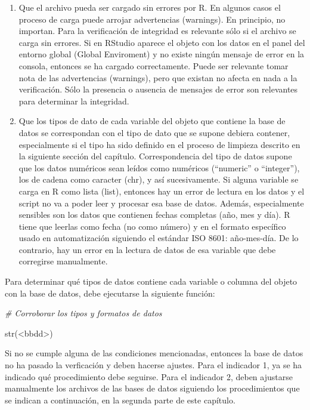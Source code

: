 \documentclass[
  spanish,
]{book}
\newenvironment{Shaded}{\begin{snugshade}}{\end{snugshade}}
\newcommand{\CommentTok}[1]{\textcolor[rgb]{0.56,0.35,0.01}{\textit{#1}}}
\newcommand{\FunctionTok}[1]{\textcolor[rgb]{0.00,0.00,0.00}{#1}}
\newcommand{\NormalTok}[1]{#1}
\newcommand{\SpecialCharTok}[1]{\textcolor[rgb]{0.00,0.00,0.00}{#1}}
\begin{document}
\begin{enumerate}
\def\labelenumi{\arabic{enumi}.}
\item
  Que el archivo pueda ser cargado sin errores por R. En algunos casos el proceso de carga puede arrojar advertencias (warnings). En principio, no importan. Para la verificación de integridad es relevante sólo si el archivo se carga sin errores. Si en RStudio aparece el objeto con los datos en el panel del entorno global (Global Enviroment) y no existe ningún mensaje de error en la consola, entonces se ha cargado correctamente. Puede ser relevante tomar nota de las advertencias (warnings), pero que existan no afecta en nada a la verificación. Sólo la presencia o ausencia de mensajes de error son relevantes para determinar la integridad.
\item
  Que los tipos de dato de cada variable del objeto que contiene la base de datos se correspondan con el tipo de dato que se supone debiera contener, especialmente si el tipo ha sido definido en el proceso de limpieza descrito en la siguiente sección del capítulo. Correspondencia del tipo de datos supone que los datos numéricos sean leídos como numéricos (``numeric'' o ``integer''), los de cadena como caracter (chr), y así sucesivamente. Si alguna variable se carga en R como lista (list), entonces hay un error de lectura en los datos y el script no va a poder leer y procesar esa base de datos. Además, especialmente sensibles son los datos que contienen fechas completas (año, mes y día). R tiene que leerlas como fecha (no como número) y en el formato específico usado en automatización siguiendo el estándar ISO 8601: año-mes-día. De lo contrario, hay un error en la lectura de datos de esa variable que debe corregirse manualmente.
\end{enumerate}

Para determinar qué tipos de datos contiene cada variable o columna del objeto con la base de datos, debe ejecutarse la siguiente función:

\begin{Shaded}
\begin{Highlighting}[]
\CommentTok{\# Corroborar los tipos y formatos de datos}

\FunctionTok{str}\NormalTok{(}\SpecialCharTok{\textless{}}\NormalTok{bbdd}\SpecialCharTok{\textgreater{}}\NormalTok{)}
\end{Highlighting}
\end{Shaded}

Si no se cumple alguna de las condiciones mencionadas, entonces la base de datos no ha pasado la verficación y deben hacerse ajustes. Para el indicador 1, ya se ha indicado qué procedimiento debe seguirse. Para el indicador 2, deben ajustarse manualmente los archivos de las bases de datos siguiendo los procedimientos que se indican a continuación, en la segunda parte de este capítulo.
\end{document}
